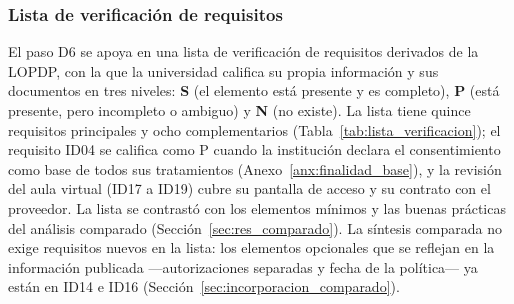 \subsubsection{Lista de verificación de requisitos}
\label{sec:lista_verificacion}

El paso D6 se apoya en una lista de verificación de requisitos derivados de la LOPDP, con la que la universidad califica su propia información y sus documentos en tres niveles: \textbf{S} (el elemento está presente y es completo), \textbf{P} (está presente, pero incompleto o ambiguo) y \textbf{N} (no existe). La lista tiene quince requisitos principales y ocho complementarios (Tabla~\ref{tab:lista_verificacion}); el requisito ID04 se califica como P cuando la institución declara el consentimiento como base de todos sus tratamientos (Anexo~\ref{anx:finalidad_base}), y la revisión del aula virtual (ID17 a ID19) cubre su pantalla de acceso y su contrato con el proveedor. La lista se contrastó con los elementos mínimos y las buenas prácticas del análisis comparado (Sección~\ref{sec:res_comparado}). La síntesis comparada no exige requisitos nuevos en la lista: los elementos opcionales que se reflejan en la información publicada ---autorizaciones separadas y fecha de la política--- ya están en ID14 e ID16 (Sección~\ref{sec:incorporacion_comparado}).

